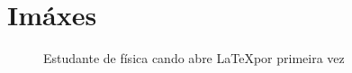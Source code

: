 \documentclass[12pt, a4paper, titlepage]{article}
\begin{document}
  
  \section{Imáxes}

  \begin{figure}[H]
    \centering
    \caption[Estudante de física cando abre \LaTeX]{Estudante de física cando abre \LaTeX por primeira vez\protect\footnotemark}
  \end{figure}



\end{document}
